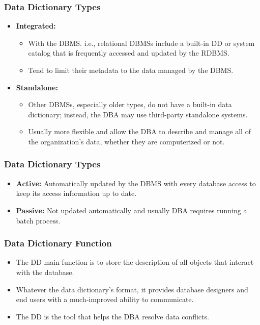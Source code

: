 \documentclass{beamer}
\begin{document}
\begin{frame}
    \frametitle{Data Dictionary Types}
    \begin{itemize}
        \item \textbf{Integrated:}
            \begin{itemize}
                \item With the DBMS. i.e., relational DBMSs include a built-in DD or system catalog that is frequently accessed and updated by the RDBMS.
                \item Tend to limit their metadata to the data managed by the DBMS.
            \end{itemize} \pause

        \item \textbf{Standalone:}
            \begin{itemize}
                \item Other DBMSs, especially older types, do not have a built-in data dictionary; instead, the DBA may use third-party standalone systems.
                \item Usually more flexible and allow the DBA to describe and manage all of the organization's data, whether they are computerized or not.
            \end{itemize}
    \end{itemize}
\end{frame}

\begin{frame}
    \frametitle{Data Dictionary Types}
    \begin{itemize}
        \item \textbf{Active:} Automatically updated by the DBMS with every database access to keep its access information up to date. \pause
        \item \textbf{Passive:} Not updated automatically and usually DBA requires running a batch process.
    \end{itemize}
\end{frame}

\begin{frame}
    \frametitle{Data Dictionary Function}
    \begin{itemize}
        \item The DD main function is to store the description of all objects that interact with the database.
        \item Whatever the data dictionary’s format, it provides database designers and end users with a much-improved ability to communicate.
        \item The DD is the tool that helps the DBA resolve data conflicts.
    \end{itemize}
\end{frame}
\end{document}
